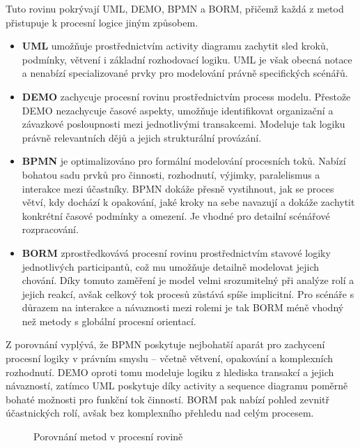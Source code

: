 Tuto rovinu pokrývají UML, DEMO, BPMN a BORM, přičemž každá z metod přistupuje k procesní logice jiným způsobem.

\begin{itemize}
  \item \textbf{UML} umožňuje prostřednictvím activity diagramu zachytit sled kroků, podmínky, větvení i základní rozhodovací logiku. UML je však obecná notace a nenabízí specializované prvky pro modelování právně specifických scénářů. 
  
  \item \textbf{DEMO} zachycuje procesní rovinu prostřednictvím
  process modelu. Přestože DEMO nezachycuje časové aspekty, umožňuje identifikovat organizační a závazkové posloupnosti mezi jednotlivými transakcemi. Modeluje tak logiku právně relevantních dějů a jejich strukturální provázání.

  \item \textbf{BPMN} je optimalizováno pro formální modelování procesních toků. Nabízí bohatou sadu prvků pro činnosti, rozhodnutí, výjimky, paralelismus a interakce mezi účastníky. BPMN dokáže přesně vystihnout, jak se proces větví, kdy dochází k opakování, jaké kroky na sebe navazují a dokáže zachytit konkrétní časové podmínky a omezení. Je vhodné pro detailní scénářové rozpracování.

  \item \textbf{BORM} zprostředkovává procesní rovinu prostřednictvím stavové logiky jednotlivých participantů, což mu umožňuje detailně modelovat jejich chování. Díky tomuto zaměření je model velmi srozumitelný při analýze rolí a jejich reakcí, avšak celkový tok procesů zůstává spíše implicitní. Pro scénáře s důrazem na interakce a návaznosti mezi rolemi je tak BORM méně vhodný než metody s globální procesní orientací.

\end{itemize}

\noindent Z porovnání vyplývá, že BPMN poskytuje nejbohatší aparát pro zachycení procesní logiky v právním smyslu – včetně větvení, opakování a komplexních rozhodnutí. DEMO oproti tomu modeluje logiku z hlediska transakcí a jejich návazností, zatímco UML poskytuje díky activity a sequence diagramu poměrně bohaté možnosti pro funkční tok činností. BORM pak nabízí pohled zevnitř účastnických rolí, avšak bez komplexního přehledu nad celým procesem.

\begin{figure}[H]
  \centering
  \caption{Porovnání metod v procesní rovině}
\end{figure}


